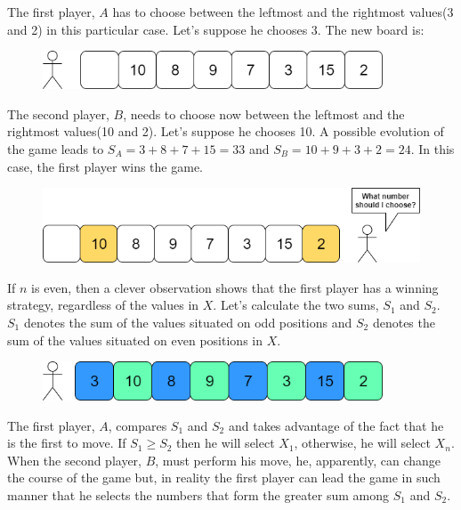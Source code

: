 \documentclass[letterpaper]{article}
\begin{document}
The first player, $A$ has to choose between the leftmost and the rightmost values(3 and 2) in this particular case. Let's suppose he chooses 3. The new board is:

\begin{figure} [h!]
\centering
\includegraphics[width=0.90\textwidth]{pngOfDiagrams/gamesandpaths2.png}
\end{figure}

The second player, $B$, needs to choose now between the leftmost and the rightmost values(10 and 2). Let's suppose he chooses 10. A possible evolution of the game leads to $S_A = 3 + 8 + 7 + 15 = 33$ and $S_B = 10 + 9 + 3 + 2 = 24$. In this case, the first player wins the game.

\newpage

\begin{figure} [h!]
\centering
\includegraphics[width=1\textwidth]{pngOfDiagrams/gamesandpaths3.png}
\end{figure}

If $n$ is even, then a clever observation shows that the first player has a winning strategy, regardless of the values in $X$. Let's calculate the two sums, $S_1$ and $S_2$. $S_1$ denotes the sum of the values situated on odd positions and $S_2$ denotes the sum of the values situated on even positions in $X$.

\begin{figure} [h!]
\centering
\includegraphics[width=0.90\textwidth]{pngOfDiagrams/gamesandpaths4 (1).png}
\end{figure}

The first player, $A$, compares $S_1$ and $S_2$ and takes advantage of the fact that he is the first to move. If $S_1 \geq S_2$ then he will select $X_1$, otherwise, he will select $X_n$. When the second player, $B$, must perform his move, he, apparently, can change the course of the game but, in reality the first player can lead the game in such manner that he selects the numbers that form the greater sum among $S_1$ and $S_2$.
\end{document}
